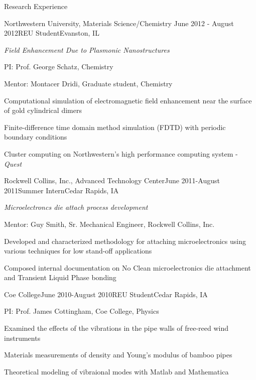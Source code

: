 \documentclass{resume} %
\begin{document}
\begin{rSection}{Research Experience}
\begin{rSubsection}{Northwestern University, Materials Science/Chemistry }{June 2012 - August 2012}{REU Student}{Evanston, IL}
\item {\em Field Enhancement Due to Plasmonic Nanostructures}

\item PI: Prof. George Schatz, Chemistry 
\item Mentor: Montacer Dridi, Graduate student, Chemistry 
\item Computational simulation of electromagnetic field enhancement near the surface of gold cylindrical dimers
\item Finite-difference time domain method simulation (FDTD) with periodic boundary conditions 
\item Cluster computing on Northwestern's high performance computing system - {\em Quest}
\end{rSubsection}


\begin{rSubsection}{Rockwell Collins, Inc., Advanced Technology Center}{June 2011-August 2011}{Summer Intern}{Cedar Rapids, IA}
\item {\em Microelectroncs die attach process development}
\item Mentor: Guy Smith, Sr. Mechanical Engineer, Rockwell Collins, Inc.
\item Developed and characterized methodology for attaching microelectronics using various techniques for low stand-off applications
\item Composed internal documentation on No Clean microelectronics die attachment and Transient Liquid Phase bonding
\end{rSubsection}


\begin{rSubsection}{Coe College}{June 2010-August 2010}{REU Student}{Cedar Rapids, IA}
\item PI: Prof. James Cottingham, Coe College, Physics 
\item Examined the effects of the vibrations in the pipe walls of free-reed wind instruments
\item Materials measurements of density and Young's modulus of bamboo pipes
\item Theoretical modeling of vibraional modes with Matlab and Mathematica
\end{rSubsection}

\end{rSection}
\end{document}
